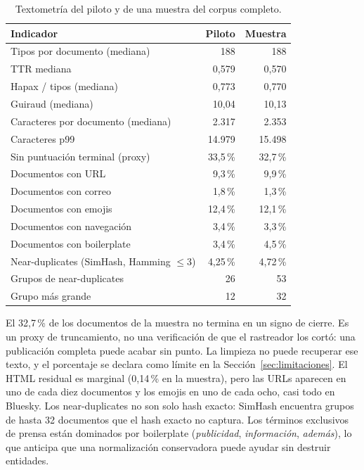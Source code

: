 \begin{table}[t]
\centering
\caption{Textometr\'ia del piloto y de una muestra del corpus completo.}
\label{tab:textometria}
\begin{tabular}{lrr}
\toprule
Indicador & Piloto & Muestra \\
\midrule
Tipos por documento (mediana) & 188 & 188 \\
TTR mediana & 0,579 & 0,570 \\
Hapax / tipos (mediana) & 0,773 & 0,770 \\
Guiraud (mediana) & 10,04 & 10,13 \\
Caracteres por documento (mediana) & 2.317 & 2.353 \\
Caracteres p99 & 14.979 & 15.498 \\
Sin puntuaci\'on terminal (proxy) & 33,5\,\% & 32,7\,\% \\
Documentos con URL & 9,3\,\% & 9,9\,\% \\
Documentos con correo & 1,8\,\% & 1,3\,\% \\
Documentos con emojis & 12,4\,\% & 12,1\,\% \\
Documentos con navegaci\'on & 3,4\,\% & 3,3\,\% \\
Documentos con boilerplate & 3,4\,\% & 4,5\,\% \\
Near-duplicates (SimHash, Hamming $\leq 3$) & 4,25\,\% & 4,72\,\% \\
Grupos de near-duplicates & 26 & 53 \\
Grupo m\'as grande & 12 & 32 \\
\bottomrule
\end{tabular}
\end{table}

El 32,7\,\% de los documentos de la muestra no termina en un signo de cierre. Es un proxy de truncamiento, no una verificaci\'on de que el rastreador los cort\'o: una publicaci\'on completa puede acabar sin punto. La limpieza no puede recuperar ese texto, y el porcentaje se declara como l\'imite en la Secci\'on~\ref{sec:limitaciones}. El HTML residual es marginal (0,14\,\% en la muestra), pero las URLs aparecen en uno de cada diez documentos y los emojis en uno de cada ocho, casi todo en Bluesky. Los near-duplicates no son solo hash exacto: SimHash encuentra grupos de hasta 32 documentos que el hash exacto no captura. Los t\'erminos exclusivos de prensa est\'an dominados por boilerplate (\emph{publicidad}, \emph{informaci\'on}, \emph{adem\'as}), lo que anticipa que una normalizaci\'on conservadora puede ayudar sin destruir entidades.


